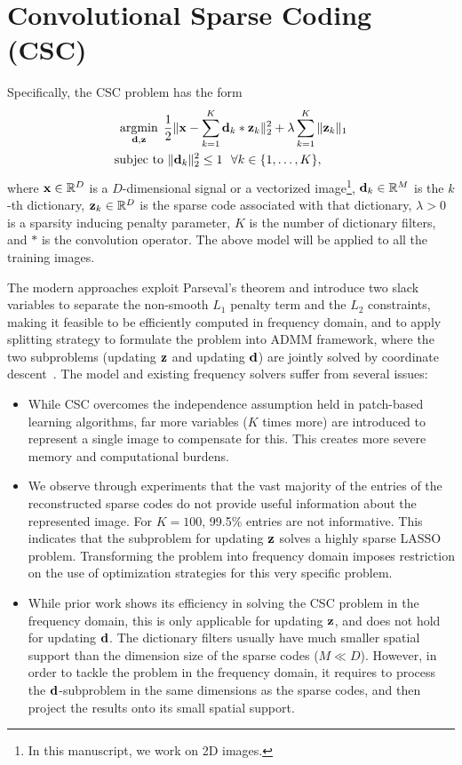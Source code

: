 \section{Convolutional Sparse Coding (CSC)}
Specifically, the CSC problem has the form
\begin{equation}
\begin{split}
    \minimize{\filter,\code} & \frac{1}{2}\|\signal - \sum_{k=1}^{K} \filter_k * \code_k \|_2^2 + \lambda \sum_{k=1}^{K}\| \code_k \|_1 \\
    \text{subjec to} & ~ \|\filter_k\|^2_2 \leq 1 ~~ \forall k \in \{1,\dots,K\},
\end{split}
\end{equation}
where $\signal \in \mathbb{R}^D$ is a $D$-dimensional signal or a vectorized image\footnote{In this manuscript, we work on 2D images.}, $\filter_k \in \mathbb{R}^M$ is the $k$-th dictionary, $\code_k\in \mathbb{R}^D$ is the sparse code associated with that dictionary,  $\lambda>0$ is a sparsity inducing penalty parameter, $K$ is the number of dictionary filters, and $*$ is the convolution operator. The above model will be applied to all the training images.

The modern approaches exploit Parseval's theorem and introduce two slack variables to separate the non-smooth $L_1$ penalty term and the $L_2$ constraints, making it feasible to be efficiently computed in frequency domain, and to apply splitting strategy to formulate the problem into ADMM framework, where the two subproblems (updating $\code$ and updating $\filter$) are jointly solved by coordinate descent~\cite{bristow2013fast,heide2015fast,wohlberg2016efficient}. The model and existing frequency solvers suffer from several issues:

\begin{itemize}
  \item While CSC overcomes the independence assumption held in patch-based learning algorithms, far more variables ($K$ times more) are introduced to represent a single image to compensate for this. This creates more severe memory and computational burdens.
  
  \item We observe through experiments that the vast majority of the entries of the reconstructed sparse codes do not provide useful information about the represented image. For $K=100$, 99.5\% entries are not informative. This indicates that the subproblem for updating $\code$ solves a highly sparse LASSO problem. Transforming the problem into frequency domain imposes restriction on the use of optimization strategies for this very specific problem.
 
  \item While prior work shows its efficiency in solving the CSC problem in the frequency domain, this is only applicable for updating $\code$, and does not hold for updating $\filter$. The dictionary filters usually have much smaller spatial support than the dimension size of the sparse codes ($M \ll D$). However, in order to tackle the problem in the frequency domain, it requires to process the $\filter$-subproblem in the same dimensions as the sparse codes, and then project the results onto its small spatial support.
\end{itemize}